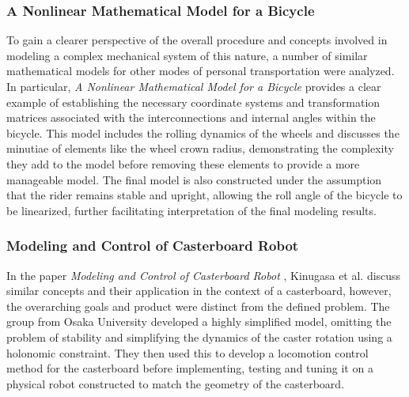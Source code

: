 \subsubsection{A Nonlinear Mathematical Model for a Bicycle}
To gain a clearer perspective of the overall procedure and concepts involved in modeling a complex mechanical system of this nature, a number of similar mathematical models for other modes of personal transportation were analyzed.
In particular, \textit{A Nonlinear Mathematical Model for a Bicycle} \cite{BikeModel} provides a clear example of establishing the necessary coordinate systems and transformation matrices associated with the interconnections and internal angles within the bicycle.
This model includes the rolling dynamics of the wheels and discusses the minutiae of elements like the wheel crown radius, demonstrating the complexity they add to the model before removing these elements to provide a more manageable model.
The final model is also constructed under the assumption that the rider remains stable and upright, allowing the roll angle of the bicycle to be linearized, further facilitating interpretation of the final modeling results. 

\subsubsection{Modeling and Control of Casterboard Robot}
In the paper \textit{Modeling and Control of Casterboard Robot} \cite{CasterboardRobot}, Kinugasa et al. discuss similar concepts and their application in the context of a casterboard, however, the overarching goals and product were distinct from the defined problem.
The group from Osaka University developed a highly simplified model, omitting the problem of stability and simplifying the dynamics of the caster rotation using a holonomic constraint. 
They then used this to develop a locomotion control method for the casterboard before implementing, testing and tuning it on a physical robot constructed to match the geometry of the casterboard.


